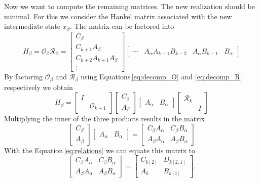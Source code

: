 \documentclass[doctype=mastersthesis,BCOR=15mm,biblatex]{ldvbook}%
\newcommand{\R}{\mathcal{R}} %
\newcommand{\Ob}{\mathcal{O}} %
\newcommand{\eye}{I} %
\begin{document}
Now we want to compute the remaining matrices.
The new realization should be minimal.
For this we consider the Hankel matrix associated with the new intermediate state $x_\beta$.
The matrix can be factored into
\begin{equation}
H_\beta = \Ob_\beta \R_\beta 
= \begin{bmatrix} C_\beta \\ C_{k+1} A_\beta \\ C_{k+2} A_{k+1} A_\beta \\ \vdots \end{bmatrix}
\begin{bmatrix} \cdots& A_\alpha A_{k-1}B_{k-2} & A_\alpha B_{k-1}&  B_\alpha  \end{bmatrix}
\end{equation}
By factoring $ \Ob_\beta $ and $\R_\beta $ using Equations\,\ref{eq:decomp_O} and \ref{eq:decomp_R} respectively we obtain
\begin{equation}
H_\beta
= \begin{bmatrix} \eye &\\ & \mathcal{O}_{k+1} \end{bmatrix} \begin{bmatrix} C_\beta \\  A_\beta \end{bmatrix}
\begin{bmatrix} A_\alpha &  B_\alpha  \end{bmatrix} \begin{bmatrix} \mathcal{R}_k\\&\eye \end{bmatrix}
\end{equation}
Multiplying the inner of the three products results in the matrix
\begin{equation}
\begin{bmatrix} C_\beta \\  A_\beta \end{bmatrix}
\begin{bmatrix} A_\alpha &  B_\alpha  \end{bmatrix}
=
\begin{bmatrix}
C_\beta A_\alpha & C_\beta B_\alpha\\
A_\beta A_\alpha & A_\beta B_\alpha
\end{bmatrix}
\end{equation}
With the Equation\,\ref{eq:relations} we can equate this matrix to 
\begin{equation}
\begin{bmatrix}
C_\beta A_\alpha & C_\beta B_\alpha\\
A_\beta A_\alpha & A_\beta B_\alpha
\end{bmatrix}
=
\begin{bmatrix}
C_{k[2]} & D_{k[2,1]}\\
A_k & B_{k[1]}
\end{bmatrix}
.
\end{equation}
\end{document}
